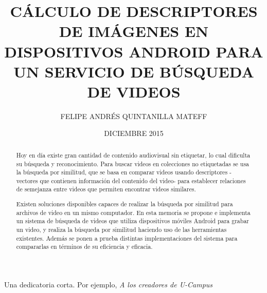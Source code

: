 \documentclass[upright, contnum]{umemoria}
\author{FELIPE ANDRÉS QUINTANILLA MATEFF}
\title{CÁLCULO DE DESCRIPTORES DE IMÁGENES EN DISPOSITIVOS ANDROID PARA UN SERVICIO DE BÚSQUEDA DE VIDEOS}
\date{DICIEMBRE 2015}
\begin{document}
\frontmatter
\maketitle

\begin{abstract}
Hoy en día existe gran cantidad de contenido audiovisual sin etiquetar, lo cual dificulta su búsqueda y reconocimiento. Para buscar videos en colecciones no etiquetadas se usa la búsqueda por similitud, que se basa en comparar videos usando descriptores -vectores que contienen información del contenido del video- para establecer relaciones de semejanza entre videos que permiten encontrar videos similares.

Existen soluciones disponibles capaces de realizar la búsqueda por similitud para archivos de video en un mismo computador. En esta memoria se propone e implementa un sistema de búsqueda de videos que utiliza dispositivos móviles Android para grabar un video, y realiza la búsqueda por similitud haciendo uso de las herramientas existentes. Además se ponen a prueba distintas implementaciones del sistema para compararlas en términos de su eficiencia y eficacia.  
\end{abstract}

\begin{dedicatoria} %
Una dedicatoria corta. Por ejemplo, \emph{A los creadores de U-Campus}
\end{dedicatoria}

\begin{thanks} %
\lipsum[1-2]
\end{thanks}
\cleardoublepage

\tableofcontents
\listoffigures %

\mainmatter
%












\end{document}
